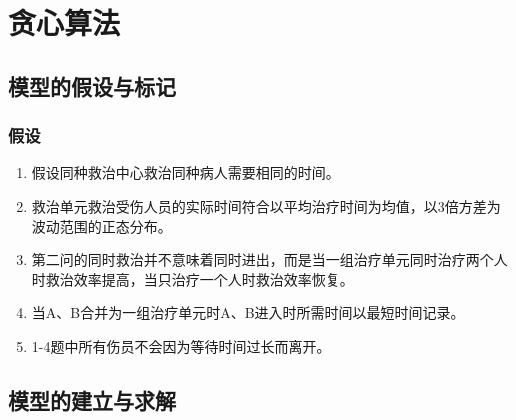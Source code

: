 \documentclass{article}
\begin{document}
\fi
\clearpage
\section{贪心算法}
\subsection{模型的假设与标记}
\subsubsection{假设}
\begin{enumerate}
	\item 假设同种救治中心救治同种病人需要相同的时间。
	\item 救治单元救治受伤人员的实际时间符合以平均治疗时间为均值，以3倍方差为波动范围的正态分布。
	\item 第二问的同时救治并不意味着同时进出，而是当一组治疗单元同时治疗两个人时救治效率提高，当只治疗一个人时救治效率恢复。
	\item 当A、B合并为一组治疗单元时A、B进入时所需时间以最短时间记录。
	\item 1-4题中所有伤员不会因为等待时间过长而离开。
\end{enumerate}
\subsection{模型的建立与求解}
\end{document}
